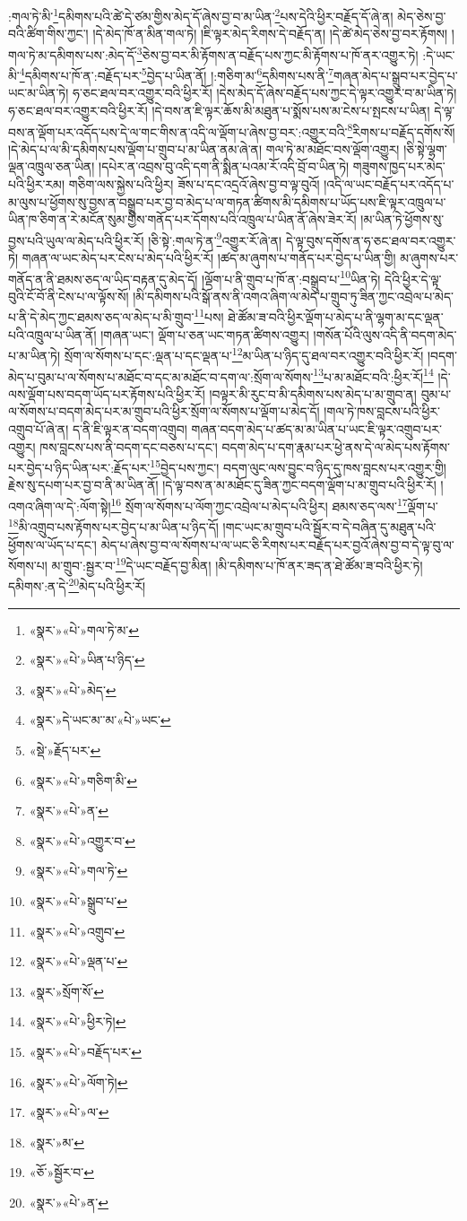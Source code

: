 :གལ་ཏེ་མི་\footnote{«སྣར་»«པེ་»གལ་ཏེ་མ་}དམིགས་པའི་ཚེ་དེ་ཙམ་གྱིས་མེད་དོ་ཞེས་བྱ་བ་མ་ཡིན་\footnote{«སྣར་»«པེ་»ཡིན་པ་ཉིད་}པས་དེའི་ཕྱིར་བརྗོད་དོ་ཞེ་ན། མེད་ཅེས་བྱ་བའི་ཚིག་གིས་ཀྱང་། །དེ་མེད་ཁོ་ན་མིན་གལ་ཏེ། །ཇི་ལྟར་མེད་རིགས་དེ་བརྗོད་ན། །དེ་ཚེ་མེད་ཅེས་བྱ་བར་རྟོགས། །གལ་ཏེ་མ་དམིགས་པས་:མེད་དོ་\footnote{«སྣར་»«པེ་»མེད་}ཅེས་བྱ་བར་མི་རྟོགས་ན་བརྗོད་པས་ཀྱང་མི་རྟོགས་པ་ཁོ་ནར་འགྱུར་ཏེ། :དེ་ཡང་མི་\footnote{«སྣར་»དེ་ཡང་མ་་མ་«པེ་»ཡང་}དམིགས་པ་ཁོ་ན་:བརྗོད་པར་\footnote{«སྡེ་»རྗོད་པར་}བྱེད་པ་ཡིན་ནོ། །:གཅིག་མ་\footnote{«སྣར་»«པེ་»གཅིག་མི་}དམིགས་པས་ནི་\footnote{«སྣར་»«པེ་»ན་}གཞན་མེད་པ་སྒྲུབ་པར་བྱེད་པ་ཡང་མ་ཡིན་ཏེ། ཧ་ཅང་ཐལ་བར་འགྱུར་བའི་ཕྱིར་རོ། །དེས་མེད་དོ་ཞེས་བརྗོད་པས་ཀྱང་དེ་ལྟར་འགྱུར་བ་མ་ཡིན་ཏེ། ཧ་ཅང་ཐལ་བར་འགྱུར་བའི་ཕྱིར་རོ། །དེ་བས་ན་ཇི་ལྟར་ཆོས་མི་མཐུན་པ་སྨོས་པས་མ་ངེས་པ་སྤངས་པ་ཡིན། དེ་ལྟ་བས་ན་ལྡོག་པར་འདོད་པས་དེ་ལ་གང་གིས་ན་འདི་ལ་ལྡོག་པ་ཞེས་བྱ་བར་:འགྱུར་བའི་\footnote{«སྣར་»«པེ་»འགྱུར་བ་}རིགས་པ་བརྗོད་དགོས་སོ། །དེ་མེད་པ་ལ་མི་དམིགས་པས་ལྡོག་པ་གྲུབ་པ་མ་ཡིན་ནམ་ཞེ་ན། གལ་ཏེ་མ་མཐོང་བས་ལྡོག་འགྱུར། །ཅི་སྟེ་ལྷག་ལྡན་འཁྲུལ་ཅན་ཡིན། །དཔེར་ན་འབྲས་བུ་འདི་དག་ནི་སྨིན་པའམ་རོ་འདི་བྲོ་བ་ཡིན་ཏེ། གཟུགས་ཁྱད་པར་མེད་པའི་ཕྱིར་རམ། གཅིག་ལས་སྐྱེས་པའི་ཕྱིར། ཟོས་པ་དང་འདྲའོ་ཞེས་བྱ་བ་ལྟ་བུའོ། །འདི་ལ་ཡང་བརྗོད་པར་འདོད་པ་མ་ལུས་པ་ཕྱོགས་སུ་བྱས་ན་བསྒྲུབ་པར་བྱ་བ་མེད་པ་ལ་གཏན་ཚིགས་མི་དམིགས་པ་ཡོད་པས་ཇི་ལྟར་འཁྲུལ་པ་ཡིན་ཁ་ཅིག་ན་རེ་མངོན་སུམ་གྱིས་གནོད་པར་དོགས་པའི་འཁྲུལ་པ་ཡིན་ནོ་ཞེས་ཟེར་རོ། །མ་ཡིན་ཏེ་ཕྱོགས་སུ་བྱས་པའི་ཡུལ་ལ་མེད་པའི་ཕྱིར་རོ། །ཅི་སྟེ་:གལ་ཏེ་ན་\footnote{«སྣར་»«པེ་»གལ་ཏེ་}འགྱུར་རོ་ཞེ་ན། དེ་ལྟ་བུས་དགོས་ན་ཧ་ཅང་ཐལ་བར་འགྱུར་ཏེ། གཞན་ལ་ཡང་མེད་པར་ངེས་པ་མེད་པའི་ཕྱིར་རོ། །ཚད་མ་ཞུགས་པ་གནོད་པར་བྱེད་པ་ཡིན་གྱི། མ་ཞུགས་པར་གནོད་ན་ནི་ཐམས་ཅད་ལ་ཡིད་བརྟན་དུ་མེད་དོ། །ལྡོག་པ་ནི་གྲུབ་པ་ཁོ་ན་:བསྒྲུབ་པ་\footnote{«སྣར་»«པེ་»སྒྲུབ་པ་}ཡིན་ཏེ། དེའི་ཕྱིར་དེ་ལྟ་བུའི་ངོ་བོ་ནི་ངེས་པ་ལ་ལྟོས་སོ། །མི་དམིགས་པའི་སྒོ་ནས་ནི་འགའ་ཞིག་ལ་མེད་པ་གྲུབ་ཏུ་ཟིན་ཀྱང་འབྲེལ་པ་མེད་པ་ནི་དེ་མེད་ཀྱང་ཐམས་ཅད་ལ་མེད་པ་མི་གྲུབ་\footnote{«སྣར་»«པེ་»འགྲུབ་}པས། ཐེ་ཚོམ་ཟ་བའི་ཕྱིར་ལྡོག་པ་མེད་པ་ནི་ལྷག་མ་དང་ལྡན་པའི་འཁྲུལ་པ་ཡིན་ནོ། །གཞན་ཡང་། ལྡོག་པ་ཅན་ཡང་གཏན་ཚིགས་འགྱུར། །གསོན་པོའི་ལུས་འདི་ནི་བདག་མེད་པ་མ་ཡིན་ཏེ། སྲོག་ལ་སོགས་པ་དང་:ལྡན་པ་དང་ལྡན་པ་\footnote{«སྣར་»«པེ་»ལྡན་པ་}མ་ཡིན་པ་ཉིད་དུ་ཐལ་བར་འགྱུར་བའི་ཕྱིར་རོ། །བདག་མེད་པ་བུམ་པ་ལ་སོགས་པ་མཐོང་བ་དང་མ་མཐོང་བ་དག་ལ་:སྲོག་ལ་སོགས་\footnote{«སྣར་»སྲོག་སོ་}པ་མ་མཐོང་བའི་:ཕྱིར་རོ།\footnote{«སྣར་»«པེ་»ཕྱིར་ཏེ།} །དེ་ལས་ལྡོག་པས་བདག་ཡོད་པར་རྟོགས་པའི་ཕྱིར་རོ། །བལྟར་མི་རུང་བ་མི་དམིགས་པས་མེད་པ་མ་གྲུབ་ན། བུམ་པ་ལ་སོགས་པ་བདག་མེད་པར་མ་གྲུབ་པའི་ཕྱིར་སྲོག་ལ་སོགས་པ་ལྡོག་པ་མེད་དོ། །གལ་ཏེ་ཁས་བླངས་པའི་ཕྱིར་འགྲུབ་པོ་ཞེ་ན། ད་ནི་ཇི་ལྟར་ན་བདག་འགྲུབ། གཞན་བདག་མེད་པ་ཚད་མ་མ་ཡིན་པ་ཡང་ཇི་ལྟར་འགྲུབ་པར་འགྱུར། ཁས་བླངས་པས་ནི་བདག་དང་བཅས་པ་དང་། བདག་མེད་པ་དག་རྣམ་པར་ཕྱེ་ནས་དེ་ལ་མེད་པས་རྟོགས་པར་བྱེད་པ་ཉིད་ཡིན་པར་:རྗོད་པར་\footnote{«སྣར་»«པེ་»བརྗོད་པར་}བྱེད་པས་ཀྱང་། བདག་ལུང་ལས་བྱུང་བ་ཉིད་དུ་ཁས་བླངས་པར་འགྱུར་གྱི། རྗེས་སུ་དཔག་པར་བྱ་བ་ནི་མ་ཡིན་ནོ། །དེ་ལྟ་བས་ན་མ་མཐོང་དུ་ཟིན་ཀྱང་བདག་ལྡོག་པ་མ་གྲུབ་པའི་ཕྱིར་རོ། །འགའ་ཞིག་ལ་དེ་:ལོག་སྟེ།\footnote{«སྣར་»«པེ་»ལོག་ཏེ།} སྲོག་ལ་སོགས་པ་ལོག་ཀྱང་འབྲེལ་པ་མེད་པའི་ཕྱིར། ཐམས་ཅད་ལས་\footnote{«སྣར་»«པེ་»ལ་}ལྡོག་པ་\footnote{«སྣར་»མ་}མི་འགྲུབ་པས་རྟོགས་པར་བྱེད་པ་མ་ཡིན་པ་ཉིད་དོ། །གང་ཡང་མ་གྲུབ་པའི་སྦྱོར་བ་དེ་བཞིན་དུ་མཐུན་པའི་ཕྱོགས་ལ་ཡོད་པ་དང་། མེད་པ་ཞེས་བྱ་བ་ལ་སོགས་པ་ལ་ཡང་ཅི་རིགས་པར་བརྗོད་པར་བྱའོ་ཞེས་བྱ་བ་དེ་ལྟ་བུ་ལ་སོགས་པ། མ་གྲུབ་:སྦྱར་བ་\footnote{«ཅོ་»སྦྱོར་བ་}དེ་ཡང་བརྗོད་བྱ་མིན། །མི་དམིགས་པ་ཁོ་ནར་ཟད་ན་ཐེ་ཚོམ་ཟ་བའི་ཕྱིར་ཏེ། དམིགས་:ན་དེ་\footnote{«སྣར་»«པེ་»ན་}མེད་པའི་ཕྱིར་རོ། 